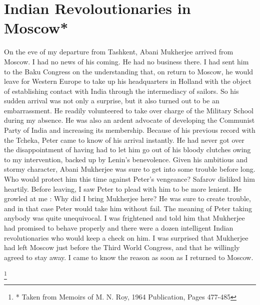 \section{Indian Revoloutionaries in Moscow*}

On the eve of my departure from Tashkent, Abani Mukherjee arrived from Moscow. I had no news of his coming. He had no business there. I had sent him to the Baku Congress on the understanding that, on return to Moscow, he would leave for Western Europe to take up his headquarters in Holland with the object of establishing contact with India through the intermediacy of sailors. So his sudden arrival was not only a surprise, but it also turned out to be an embarrassment. He readily volunteered to take over charge of the Military School during my absence. He was also an ardent advocate of developing the Communist Party of India and increasing its membership. Because of his previous record with the Tcheka, Peter came to know of his arrival instantly. He had never got over the disappointment of having had to let him go out of his bloody clutches owing to my intervention, backed up by Lenin's benevolence. Given his ambitious and stormy character, Abani Mukherjee was sure to get into some trouble before long. Who would protect him this time against Peter's vengeance? Safarov disliked him heartily. Before leaving, I saw Peter to plead with him to be more lenient. He growled at me : Why did I bring Mukherjee here? He was sure to create trouble, and in that case Peter would take him without fail. The meaning of Peter taking anybody was quite unequivocal. I was frightened and told him that Mukherjee had promised to behave properly and there were a dozen intelligent Indian revolutionaries who would keep a check on him. I was surprised that Mukherjee had left Moscow just before the Third World Congress, and that he willingly agreed to stay away. I came to know the reason as soon as I returned to Moscow.

\footnote{* Taken from Memoirs of M. N. Roy, 1964 Publication, Pages 477-485 }

